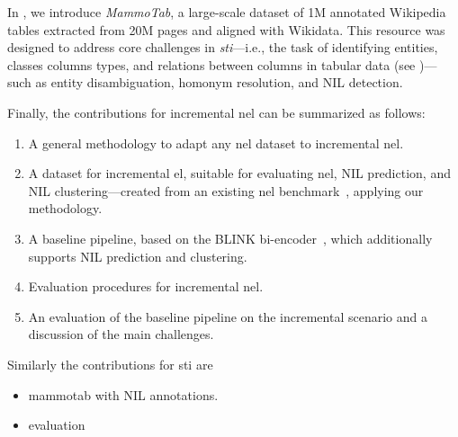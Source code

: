 In \textcite{mammotab}, we introduce \emph{MammoTab}, a large-scale dataset of 1M annotated Wikipedia tables extracted from 20M pages and aligned with Wikidata. This resource was designed to address core challenges in \emph{\acf{sti}}---i.e., the task of identifying entities, classes columns types, and relations between columns in tabular data (see )---such as entity disambiguation, homonym resolution, and NIL detection.

Finally, the contributions for incremental \ac{nel} can be summarized as follows:
\begin{enumerate}
    \item A general methodology to adapt any \ac{nel} dataset to incremental \ac{nel}.
    \item A dataset for incremental \ac{el}, suitable for evaluating \ac{nel}, NIL prediction, and NIL clustering---created from an existing \ac{nel} benchmark~\cite{Onoe_Durrett_2020}, applying our methodology.
    \item A baseline pipeline, based on the BLINK bi-encoder~\cite{blink}, which additionally supports NIL prediction and clustering.
    \item Evaluation procedures for incremental \ac{nel}.
    \item An evaluation of the baseline pipeline on the incremental scenario and a discussion of the main challenges.
\end{enumerate}
Similarly the contributions for \ac{sti} are
\begin{itemize}
    \item mammotab with NIL annotations.
    \item evaluation\todo{}
\end{itemize}